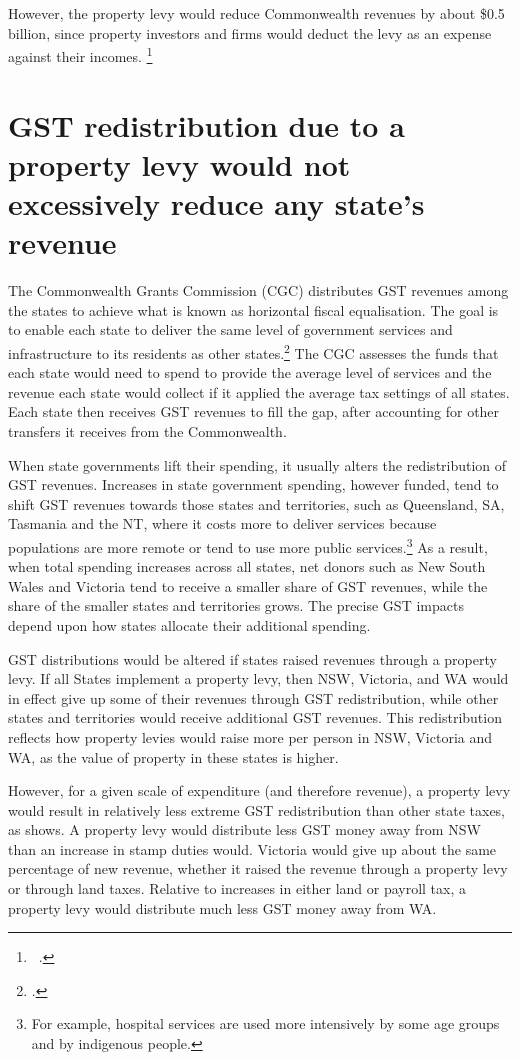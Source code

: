 However, the property levy would reduce Commonwealth revenues by about \$0.5 billion, since property investors and firms would deduct the levy as an expense against their incomes.%
\footnote{\gao\ \textcites{ABS2013t}{ATOmultipleyears}{ABS2014k}.}

\section{\label{sec:PROP-3-4}GST redistribution due to a property levy would not excessively reduce any state’s revenue}
The Commonwealth Grants Commission (CGC) distributes GST revenues among the states to achieve what is known as horizontal fiscal equalisation. The goal is to enable each state to deliver the same level of government services and infrastructure to its residents as other states.\footcite[][1]{CGC2015}  The CGC assesses the funds that each state would need to spend to provide the average level of services and the revenue each state would collect if it applied the average tax settings of all states. Each state then receives GST revenues to fill the gap, after accounting for other transfers it receives from the Commonwealth. 

When state governments lift their spending, it usually alters the redistribution of GST revenues. Increases in state government spending, however funded, tend to shift GST revenues towards those states and territories, such as Queensland, SA, Tasmania and the NT, where it costs more to deliver services because populations are more remote or tend to use more public services.\footnote{For example, hospital services are used more intensively by some age groups and by indigenous people.}  As a result, when total spending increases across all states, net donors such as New South Wales and Victoria tend to receive a smaller share of GST revenues, while the share of the smaller states and territories grows. The precise GST impacts depend upon how states allocate their additional spending.

GST distributions would be altered if states raised revenues through a property levy. If all States implement a property levy, then NSW, Victoria, and WA would in effect give up some of their revenues through GST redistribution, while other states and territories would receive additional GST revenues. This redistribution reflects how property levies would raise more per person in NSW, Victoria and WA, as the value of property in these states is higher. 

However, for a given scale of expenditure (and therefore revenue), a property levy would result in relatively less extreme GST redistribution than other state taxes, as  shows. A property levy would distribute less GST money away from NSW than an increase in stamp duties would. Victoria would give up about the same percentage of new revenue, whether it raised the revenue through a property levy or through land taxes. Relative to increases in either land or payroll tax, a property levy would distribute much less GST money away from WA. 

